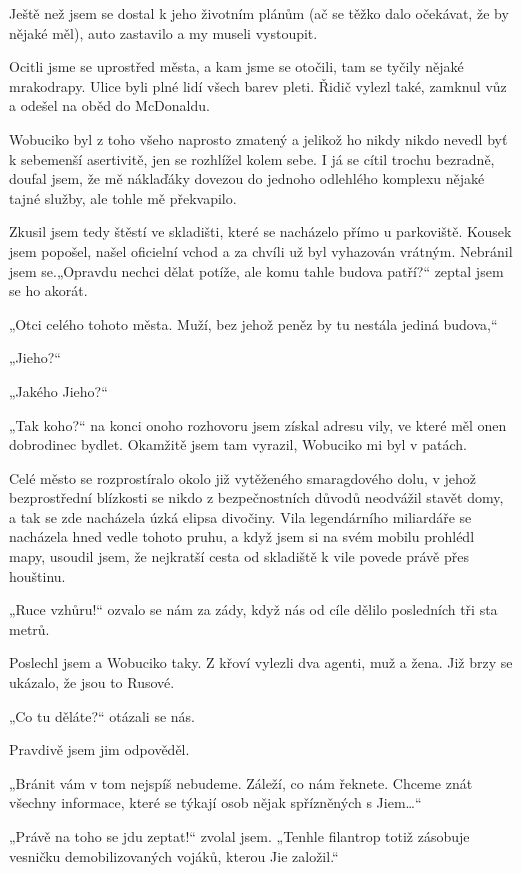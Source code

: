 Ještě než jsem se dostal k jeho životním plánům (ač se těžko dalo očekávat, že by nějaké měl), auto zastavilo a my museli vystoupit.

Ocitli jsme se uprostřed města, a kam jsme se otočili, tam se tyčily nějaké mrakodrapy. Ulice byli plné lidí všech barev pleti. Řidič vylezl také, zamknul vůz a odešel na oběd do McDonaldu.

Wobuciko byl z toho všeho naprosto zmatený a jelikož ho nikdy nikdo nevedl byť k sebemenší asertivitě, jen se rozhlížel kolem sebe. I já se cítil trochu bezradně, doufal jsem, že mě náklaďáky dovezou do jednoho odlehlého komplexu nějaké tajné služby, ale tohle mě překvapilo. 

Zkusil jsem tedy štěstí ve skladišti, které se nacházelo přímo u parkoviště. Kousek jsem popošel, našel oficielní vchod a za chvíli už byl vyhazován vrátným. Nebránil jsem se.„Opravdu nechci dělat potíže, ale komu tahle budova patří?“ zeptal jsem se ho akorát. 

„Otci celého tohoto města. Muží, bez jehož peněz by tu nestála jediná budova,“

„Jieho?“

„Jakého Jieho?“

„Tak koho?“ na konci onoho rozhovoru jsem získal adresu vily, ve které měl onen dobrodinec bydlet. Okamžitě jsem tam vyrazil, Wobuciko mi byl v patách.

Celé město se rozprostíralo okolo již vytěženého smaragdového dolu, v jehož bezprostřední blízkosti se nikdo z bezpečnostních důvodů neodvážil stavět domy, a tak se zde nacházela úzká elipsa divočiny. Vila legendárního miliardáře se nacházela hned vedle tohoto pruhu, a když jsem si na svém mobilu prohlédl mapy, usoudil jsem, že nejkratší cesta od skladiště k vile povede právě přes houštinu.

„Ruce vzhůru!“ ozvalo se nám za zády, když nás od cíle dělilo posledních tři sta metrů.

Poslechl jsem a Wobuciko taky. Z křoví vylezli dva agenti, muž a žena. Již brzy se ukázalo, že jsou to Rusové.

„Co tu děláte?“ otázali se nás.

Pravdivě jsem jim odpověděl.
	
 „Bránit vám v tom nejspíš nebudeme. Záleží, co nám řeknete. Chceme znát všechny informace, které se týkají osob nějak spřízněných s Jiem…“

„Právě na toho se jdu zeptat!“ zvolal jsem. „Tenhle filantrop totiž zásobuje vesničku demobilizovaných vojáků, kterou Jie založil.“

